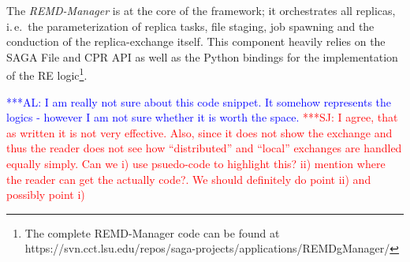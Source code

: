 \documentclass[conference,final]{IEEEtran}
\newcommand{\alnote}[1]{ {\textcolor{blue} { ***AL: #1 }}}
\newcommand{\jhanote}[1]{ {\textcolor{red} { ***SJ: #1 }}}
\newcommand{\alnote}[1]{}
\newcommand{\jhanote}[1]{}
\begin{document}
The \emph{REMD-Manager} is at the core of the framework; it
orchestrates all replicas, i.\,e.\ the parameterization of replica
tasks, file staging, job spawning and the conduction of the
replica-exchange itself. This component heavily relies on the SAGA
File and CPR API as well as the Python bindings for the implementation
of the RE logic\footnote{The complete REMD-Manager code can be found
  at
  https://svn.cct.lsu.edu/repos/saga-projects/applications/REMDgManager/}.

                                  
\alnote{I am really not sure about this code snippet. It somehow
  represents the logics - however I am not sure whether it is worth
  the space.} \jhanote{I agree, that as written it is not very
  effective. Also, since it does not show the exchange and thus the
  reader does not see how ``distributed'' and ``local'' exchanges are
  handled equally simply. Can we i) use psuedo-code to highlight this?
  ii) mention where the reader can get the actually code?. We should
  definitely do point ii) and possibly point i)}

\end{document}

